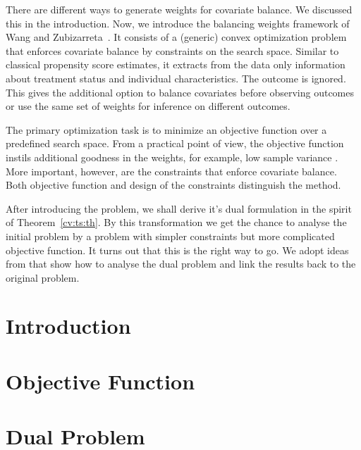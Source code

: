 There are different ways
to generate weights for covariate balance.
%
We discussed this in the introduction.
%
Now, we introduce the balancing weights framework of Wang and Zubizarreta~\cite{Wang2019}.
%
It consists of a (generic) convex optimization problem
that enforces covariate balance by constraints on the search space.
%
Similar to classical propensity score estimates, it
extracts from the data only information about treatment status and individual characteristics.
%
The outcome is ignored.
%
This gives the additional option to balance covariates before observing outcomes or use the same set of weights for inference on different outcomes.

%
The primary optimization task is to minimize an objective function
over a predefined search space.
%
From a practical point of view, the objective function
instils additional goodness in the weights, 
for example, 
low sample variance \cite[Introduction]{Zubizarreta2015}. 
%
%
More important, however, are the constraints that enforce covariate balance.
%
Both objective function and design of the constraints distinguish the method.
%

After introducing the problem, we shall derive it's dual formulation in the spirit of Theorem~\ref{cv:ts:th}.
By this transformation we get the chance to analyse the initial problem by a problem with simpler constraints but more complicated objective function.
It turns out that this is the right way to go.
We adopt ideas from \cite{Wang2019, Tseng1991} that show how to analyse the dual problem and link the results back to the original problem. 
\section{Introduction}



\section{Objective Function}

\section{Dual Problem}




%
%


